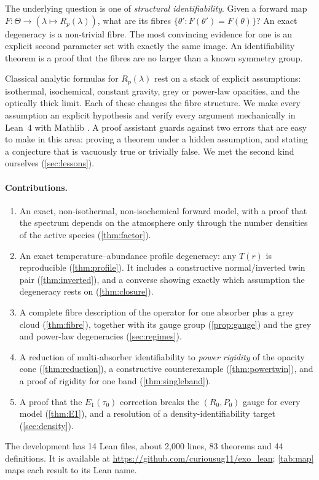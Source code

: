 \documentclass[11pt]{article}
\theoremstyle{definition}
\theoremstyle{remark}
\begin{document}
The underlying question is one of \emph{structural identifiability}. Given a forward map
$F:\Theta\to(\lambda\mapsto R_p(\lambda))$, what are its fibres
$\{\theta' : F(\theta')=F(\theta)\}$? An exact degeneracy is a non-trivial fibre. The most
convincing evidence for one is an explicit second parameter set with exactly the same image.
An identifiability theorem is a proof that the fibres are no larger than a known symmetry
group.

Classical analytic formulas for $R_p(\lambda)$
\citep{Brown2001,Fortney2005,LecavelierDesEtangs2008,deWitSeager2013,HengKitzmann2017}
rest on a stack of explicit assumptions: isothermal, isochemical, constant gravity, grey or
power-law opacities, and the optically thick limit. Each of these changes the fibre structure.
We make every assumption an explicit hypothesis and verify every argument mechanically in
Lean~4 \citep{deMouraUllrich2021} with Mathlib \citep{mathlib2020}. A proof assistant guards
against two errors that are easy to make in this area: proving a theorem under a hidden
assumption, and stating a conjecture that is vacuously true or trivially false. We met the
second kind ourselves (\cref{sec:lessons}).

\paragraph{Contributions.}
\begin{enumerate}
\item An exact, non-isothermal, non-isochemical forward model, with a proof that the spectrum
  depends on the atmosphere only through the number densities of the active species
  (\cref{thm:factor}).
\item An exact temperature--abundance profile degeneracy: any $T(r)$ is reproducible
  (\cref{thm:profile}). It includes a constructive normal/inverted twin pair
  (\cref{thm:inverted}), and a converse showing exactly which assumption the degeneracy rests
  on (\cref{thm:closure}).
\item A complete fibre description of the \citet{HengKitzmann2017} operator for one absorber
  plus a grey cloud (\cref{thm:fibre}), together with its gauge group (\cref{prop:gauge}) and
  the grey and power-law degeneracies (\cref{sec:regimes}).
\item A reduction of multi-absorber identifiability to \emph{power rigidity} of the opacity
  cone (\cref{thm:reduction}), a constructive counterexample (\cref{thm:powertwin}), and a
  proof of rigidity for one band (\cref{thm:singleband}).
\item A proof that the $E_1(\tau_0)$ correction breaks the $(R_0,P_0)$ gauge for every model
  (\cref{thm:E1}), and a resolution of a density-identifiability target (\cref{sec:density}).
\end{enumerate}
The development has 14 Lean files, about 2{,}000 lines, 83 theorems and 44 definitions. It is
available at \url{https://github.com/curiousug11/exo_lean}; \cref{tab:map} maps each result
to its Lean name.
\end{document}

